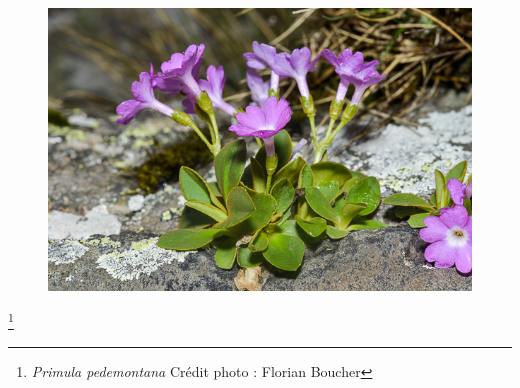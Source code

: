 \documentclass[12pt,a4paper,notitlepage]{article}
\begin{document}
\begin{titlepage}
\begin{figure}[h]
\begin{center}
\includegraphics[scale=3]{fig/primulapedemontana_7.jpg}

\end{center}
\end{figure}
\thispagestyle{empty}

{\let\thefootnote\relax\footnote{{ \textit{Primula pedemontana} Crédit photo : Florian Boucher}}}

\newpage
\begin{abstract} %
\begin{center}

\lipsum[1]

\end{center}
\end{abstract}
\thispagestyle{empty}

\end{titlepage}
\tableofcontents

\newpage
\end{document}
